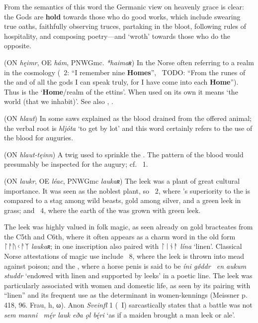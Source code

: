 \begin{itemize}
  From the semantics of this word the Germanic view on heavenly grace is clear: the Gods are \textbf{hold} towards those who do good works, which include swearing true oaths, faithfully observing truces, partaking in the bloot, following rules of hospitality, and composing poetry—and  ‘wroth’ towards those who do the opposite.

 (ON \emph{hęimr}, OE \emph{hám}, PNWGmc. \emph{*haimaʀ})
  In the Norse often referring to a realm in the cosmology (\Voluspa\ 2: “I remember nine \textbf{Homes}”, \Vafthrudnismal\ TODO: “From the runes of the  and of all the gods I can speak truly, for I have come into each \textbf{Home}”). Thus  is the ‘\textbf{Home}/realm of the ettins’. When used on its own it means ‘the world (that we inhabit)’. See also , .

 (ON \emph{hlaut})
  In some saws explained as the blood drained from the offered animal; the verbal root is \emph{hljóta} ‘to get by lot’ and this word certainly refers to the use of the blood for auguries.

 (ON \emph{hlaut-tęinn})
  A twig used to sprinkle the .  The pattern of the blood would presumably be inspected for the augury; cf. \Hymiskvida\ 1.

 (ON \emph{laukr}, OE \emph{léac}, PNWGmc \emph{laukaʀ})
  The leek was a plant of great cultural importance.  It was seen as the noblest plant, so \GudrunTwo\ 2, where ’s superiority to the  is compared to a stag among wild beasts, gold among silver, and a green leek in grass; and \Voluspa\ 4, where the earth of the  was grown with green leek.

  The leek was highly valued in folk magic, as seen already on gold bracteates from the C5th and C6th, where it often appears as a charm word in the old form {ᛚᚨᚢᚲᚨᛉ} \emph{laukaʀ}; in one inscription also paired with {ᛚᛁᚾᚨ} \emph{lína} ‘linen’.  Classical Norse attestations of magic use include \Sigrdrifumal\ 8, where the leek is thrown into mead against poison; and the \Volsathattr, where a horse penis is said to be \emph{íni gǿddr \hld\ en aukum studdr} ‘endowed with linen and supported by leeks’ in a poetic line.  The leek was particularly associated with women and domestic life, as seen by its pairing with “linen” and its frequent use as the determinant in women-kennings (Meissner p. 418, 96. Frau, h, \textgreek{ω}).  Anon \emph{Sveinfl} 1 (\Skp\ I) sarcastically states that a battle was not \emph{sem manni \hld\ mę́r lauk eða ǫl bę́ri} ‘as if a maiden brought a man leek or ale’.%


\end{itemize}
